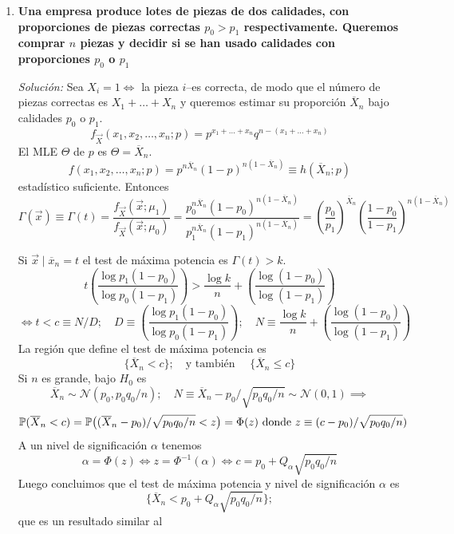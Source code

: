 \begin{enumerate}
  \item \textbf{Una empresa produce lotes de piezas de dos calidades, con proporciones de piezas correctas $p_0 > p_1$ respectivamente. Queremos comprar $n$ piezas y decidir si se han usado calidades con proporciones $p_0$ o $p_1$}

  \smallskip
  \noindent\emph{Solución:} Sea $X_i = 1 \iff$ la pieza $i$--es correcta, de modo que el número de piezas correctas es $X_1 + \dots + X_n$ y queremos estimar su proporción $\overline{X}_n$ bajo calidades $p_0$ o $p_1$.
  \[
    f_{\vec{X}}(x_1, x_2, \dots, x_n; p) = p^{x_1 + \dots + x_n} q^{n - (x_1 + \dots + x_n)}
  \]
  El MLE $\Theta$ de $p$ es $\Theta = \overline{X}_n$.
  \[
    f(x_1, x_2, \dots, x_n; p) = p^{n\overline{X}_n} (1 - p)^{n(1 - \overline{X}_n)} \equiv h(\overline{X}_n; p)
  \]
  estadístico suficiente. Entonces
  \[
    \Gamma(\vec{x}) \equiv \Gamma(t) = \frac{f_{\vec{X}}(\vec{x}; \mu_1)}{f_{\vec{X}}(\vec{x}; \mu_0)} = \frac{p_0^{n\overline{X}_n} (1 - p_0)^{n(1 - \overline{X}_n)}}{p_1^{n\overline{X}_n} (1 - p_1)^{n(1 - \overline{X}_n)}} = \left(\frac{p_0}{p_1}\right)^{\overline{X}_n}\left(\frac{1 - p_0}{1 - p_1}\right)^{n(1 - \overline{X}_n)}
  \]

  Si $\vec{x} \mid \overline{x}_n = t$ el test de máxima potencia es $\Gamma(t) > k$.
  \[
    t\left(\frac{\log p_1(1 - p_0)}{\log p_0(1 - p_1)}\right) > \frac{\log k}{n} + \left(\frac{\log(1 - p_0)}{\log(1 - p_1)}\right)
  \]
  \[
    \iff t < c \equiv N/D; \quad D \equiv \left(\frac{\log p_1(1 - p_0)}{\log p_0(1 - p_1)}\right); \quad N \equiv \frac{\log k}{n} + \left(\frac{\log(1 - p_0)}{\log(1 - p_1)}\right)
  \]
  La región que define el test de máxima potencia es
  \[
    \{\overline{X}_n < c\}; \quad \text{y tambi\'en } \quad \{\overline{X}_n \leq c\}
  \]
  Si $n$ es grande, bajo $H_0$ es
  \[
    \overline{X}_n \sim \mathcal N(p_0, p_0 q_0 / n); \quad N \equiv \overline{X}_n - p_0 / \sqrt{p_0 q_0 / n} \sim \mathcal N(0, 1) \implies
  \]
  \[
    \mathbb{P}(\overline{X}_n < c) = \mathbb{P}\bigl((\overline{X}_n - p_0)/\sqrt{p_0 q_0 / n} < z\bigr) = \Phi(z) \text{ donde } z \equiv (c - p_0)/\sqrt{p_0 q_0 / n})
  \]
  A un nivel de significación $\alpha$ tenemos
  \[
    \alpha = \Phi(z) \iff z = \Phi^{-1}(\alpha) \iff c = p_0 + Q_\alpha \sqrt{p_0 q_0 / n}
  \]
  Luego concluimos que el test de máxima potencia y nivel de significación $\alpha$ es
  \[
    \{\overline{X}_n < p_0 + Q_\alpha \sqrt{p_0 q_0 / n}\};
  \]
  que es un resultado similar al
  \end{enumerate}
